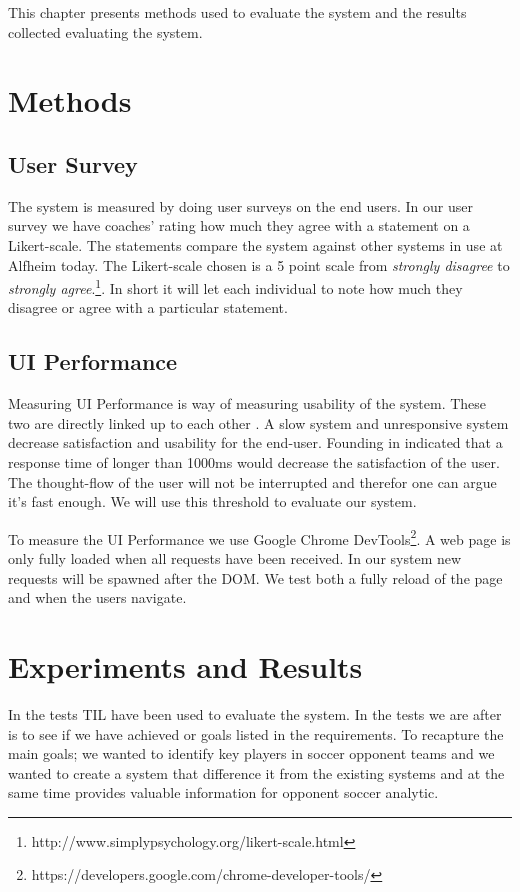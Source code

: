 This chapter presents methods used to evaluate the system and the results collected evaluating the system. 

\section{Methods}
\subsection{User Survey}

The system is measured by doing user surveys on the end users. In our user survey we have coaches’ rating how much they agree with a statement on a Likert-scale. The statements compare the system against other systems in use at Alfheim today. The Likert-scale chosen is a 5 point scale from \textit{strongly disagree} to \textit{strongly agree}.\footnote{http://www.simplypsychology.org/likert-scale.html}. In short it will let each individual to note how much they disagree or agree with a particular statement.

\subsection{UI Performance}

Measuring \ac{UI} Performance is way of measuring usability of the system. These two are directly linked up to each other \cite{satisfaction}. A slow system and unresponsive system decrease satisfaction and usability for the end-user. Founding in \cite{nielsen} indicated that a response time of longer than 1000ms would decrease the satisfaction of the user. The thought-flow of the user will not be interrupted and therefor one can argue it's fast enough. We will use this threshold to evaluate our system. 

To measure the UI Performance we use Google Chrome DevTools\footnote{https://developers.google.com/chrome-developer-tools/}. A web page is only fully loaded when all requests have been received. In our system new requests will be spawned after the \ac{DOM}. We test both a fully reload of the page and when the users navigate.

\section{Experiments and Results}

In the tests \ac{TIL} have been used to evaluate the system. In the tests we are after is to see if we have achieved or goals listed in the requirements. To recapture the main goals; we wanted to identify key players in soccer opponent teams and we wanted to create a system that difference it from the existing systems and at the same time provides valuable information for opponent soccer analytic. 

